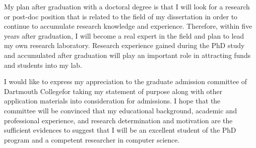 \documentclass[a4paper,10pt]{report}
\newcommand{\university}{Dartmouth College}
\begin{document}
\vspace{0.2cm}
My plan after graduation with a doctoral degree is that I will look for a research or post-doc position that is related to the field of my dissertation in order to continue to accumulate research knowledge and experience. Therefore, within five years after graduation, I will become a real expert in the field and plan to lead my own research laboratory. Research experience gained during the PhD study and accumulated after graduation will play an important role in attracting funds and students into my lab.

\vspace{0.2cm}
I would like to express my appreciation to the graduate admission committee of \university \space for taking my  statement of purpose along with other application materials into consideration for admissions. I hope that the committee will be convinced that my educational background, academic and professional experience, and research determination and motivation are the sufficient evidences to suggest that I will be an excellent student of the PhD program and a competent researcher in computer science.
\end{document}
